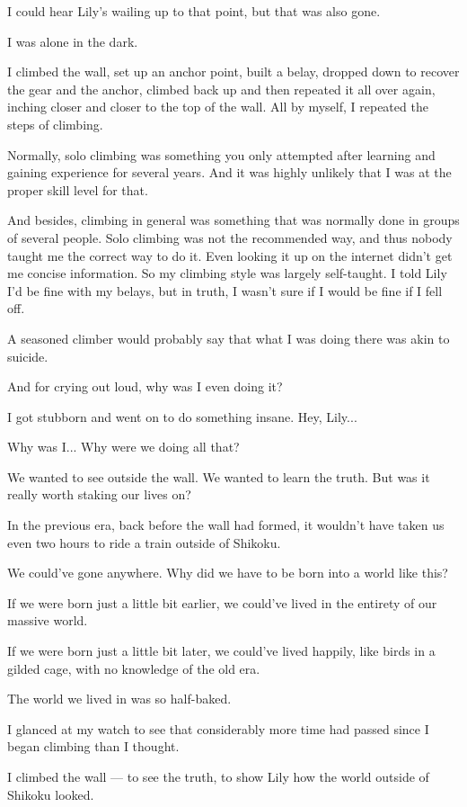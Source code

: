 I could hear Lily's wailing up to that point, but that was also gone.

I was alone in the dark.

I climbed the wall, set up an anchor point, built a belay, dropped down to recover the gear and the anchor, climbed back up and then repeated it all over again, inching closer and closer to the top of the wall. All by myself, I repeated the steps of climbing.

Normally, solo climbing was something you only attempted after learning and gaining experience for several years. And it was highly unlikely that I was at the proper skill level for that.

And besides, climbing in general was something that was normally done in groups of several people. Solo climbing was not the recommended way, and thus nobody taught me the correct way to do it. Even looking it up on the internet didn't get me concise information. So my climbing style was largely self-taught. I told Lily I'd be fine with my belays, but in truth, I wasn't sure if I would be fine if I fell off.

A seasoned climber would probably say that what I was doing there was akin to suicide.

And for crying out loud, why was I even doing it?

I got stubborn and went on to do something insane. Hey, Lily...

Why was I... Why were we doing all that?

We wanted to see outside the wall. We wanted to learn the truth. But was it really worth staking our lives on?

In the previous era, back before the wall had formed, it wouldn't have taken us even two hours to ride a train outside of Shikoku.

We could've gone anywhere. Why did we have to be born into a world like this?

If we were born just a little bit earlier, we could've lived in the entirety of our massive world.

If we were born just a little bit later, we could've lived happily, like birds in a gilded cage, with no knowledge of the old era.

The world we lived in was so half-baked.

I glanced at my watch to see that considerably more time had passed since I began climbing than I thought.

I climbed the wall --- to see the truth, to show Lily how the world outside of Shikoku looked.

